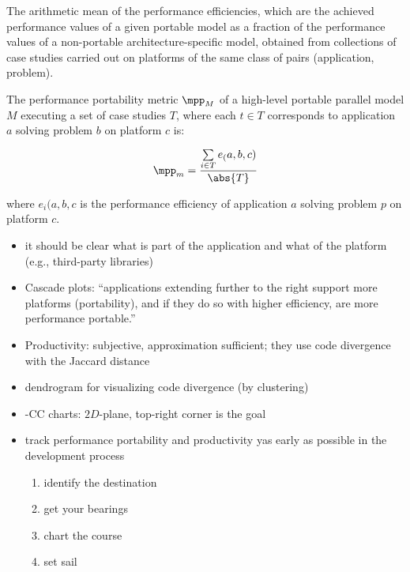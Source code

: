 \begin{definition}
The arithmetic mean of the performance efficiencies, which are the achieved performance values of a given portable model as a fraction of the performance values of a non-portable architecture-specific model, obtained from collections of case studies carried out on platforms of the same class of pairs (application, problem).
\end{definition}

\begin{definition}
The performance portability metric $\mpp_M$ of a high-level portable parallel model $M$ executing a set of case studies $T$, where each $t \in T$ corresponds to application $a$ solving problem $b$  on platform $c$ is: 

$$\mpp_m = \frac{\sum\limits_{i \in T} e_(a, b, c)}{\abs{T}}$$

where $e_i(a, b, c$ is the performance efficiency of application $a$ solving problem $p$ on platform $c$.
\end{definition}



\newpage
\cite{pennycook_navigating_2021}

\begin{itemize}
    \item it should be clear what is part of the application and what of the platform (e.g., third-party libraries)
    \item Cascade plots: \enquote{applications extending further to the right support more platforms (portability), and if they do so with higher efficiency, are more performance portable.}
    \item Productivity: subjective, approximation sufficient; they use \cite{harrell_effective_2018} code divergence with the Jaccard distance
    \item dendrogram for visualizing code divergence (by clustering)
    \item \pp-CC charts: $2D$-plane, top-right corner is the goal
    \item track performance portability and productivity yas early as possible in the development process
    \begin{enumerate}
        \item identify the destination
        \item get your bearings
        \item chart the course
        \item set sail
    \end{enumerate}
\end{itemize}

